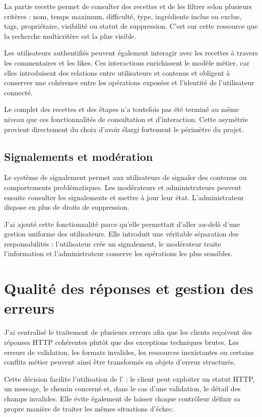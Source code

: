 La partie recette permet de consulter des recettes et de les filtrer selon plusieurs critères : nom, temps maximum, difficulté, type, ingrédients inclus ou exclus, tags, propriétaire, visibilité ou statut de suppression. C'est sur cette ressource que la recherche multicritère est la plus visible.

Les utilisateurs authentifiés peuvent également interagir avec les recettes à travers les commentaires et les likes. Ces interactions enrichissent le modèle métier, car elles introduisent des relations entre utilisateurs et contenus et obligent à conserver une cohérence entre les opérations exposées et l'identité de l'utilisateur connecté.

Le  complet des recettes et des étapes n'a toutefois pas été terminé au même niveau que ces fonctionnalités de consultation et d'interaction. Cette asymétrie provient directement du choix d'avoir élargi fortement le périmètre du projet.

\subsection{Signalements et modération}

Le système de signalement permet aux utilisateurs de signaler des contenus ou comportements problématiques. Les modérateurs et administrateurs peuvent ensuite consulter les signalements et mettre à jour leur état. L'administrateur dispose en plus de droits de suppression.

J'ai ajouté cette fonctionnalité parce qu'elle permettait d'aller au-delà d'une gestion uniforme des utilisateurs. Elle introduit une véritable séparation des responsabilités : l'utilisateur crée un signalement, le modérateur traite l'information et l'administrateur conserve les opérations les plus sensibles.

\section{Qualité des réponses et gestion des erreurs}

J'ai centralisé le traitement de plusieurs erreurs afin que les clients reçoivent des réponses HTTP cohérentes plutôt que des exceptions techniques brutes. Les erreurs de validation, les formats invalides, les ressources inexistantes ou certains conflits métier peuvent ainsi être transformés en objets d'erreur structurés.

Cette décision facilite l'utilisation de l' : le client peut exploiter un statut HTTP, un message, le chemin concerné et, dans le cas d'une validation, le détail des champs invalides. Elle évite également de laisser chaque contrôleur définir sa propre manière de traiter les mêmes situations d'échec.

